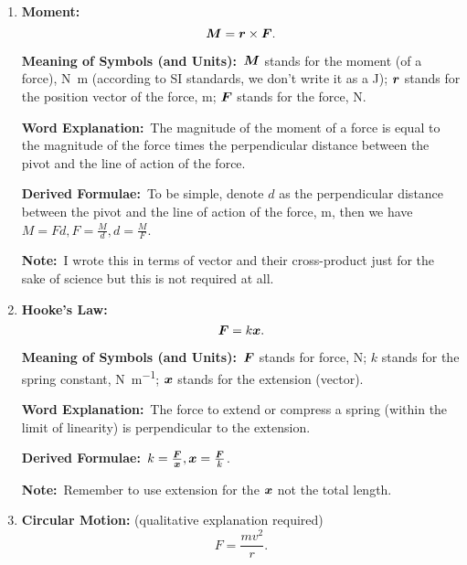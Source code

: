 \documentclass[8pt]{article}
\newcommand{\MeanSymb}{\textbf{Meaning of Symbols (and Units):}\ }
\newcommand{\WordExpl}{\textbf{Word Explanation:}\ }
\newcommand{\DeriForm}{\textbf{Derived Formulae:}\ }
\newcommand{\Note}{\textbf{Note:}\ }
\begin{document}
\begin{enumerate}
                \WordExpl Impulse is equal to the change in momentum.

                \DeriForm The following is derived from Newton's 2nd Law:
                \[
                    \vect{I} = \vect{F} \Delta t.
                \]

                \Note This is only meaningful if momentum is conserved - just like work and energy.

                \item \textbf{Moment:}
                \[
                    \boldsymbol{M} = \boldsymbol{r} \times \boldsymbol{F}.
                \]

                \MeanSymb \(\boldsymbol{M}\) stands for the moment (of a force), \unit{\newton \metre} (according to SI standards, we don't write it as a \unit{\joule}); \(\boldsymbol{r}\) stands for the position vector of the force, \unit{\metre}; \(\boldsymbol{F}\) stands for the force, \unit{\newton}.

                \WordExpl The magnitude of the moment of a force is equal to the magnitude of the force times the perpendicular distance between the pivot and the line of action of the force.

                \DeriForm To be simple, denote \(d\) as the perpendicular distance between the pivot and the line of action of the force, \unit{\metre}, then we have \(M = Fd, F = \frac{M}{d}, d = \frac{M}{F}\).

                \Note I wrote this in terms of vector and their cross-product just for the sake of science but this is not required at all.

                \item \textbf{Hooke's Law:}
                \[
                    \boldsymbol{F} = k \boldsymbol{x}.
                \]

                \MeanSymb \(\boldsymbol{F}\) stands for force, \unit{\newton}; \(k\) stands for the spring constant, \unit{\newton \per \metre}; \(\boldsymbol{x}\) stands for the extension (vector).

                \WordExpl The force to extend or compress a spring (within the limit of linearity) is perpendicular to the extension.

                \DeriForm \(k = \frac{\boldsymbol{F}}{\boldsymbol{x}}, \boldsymbol{x} = \frac{\boldsymbol{F}}{k}\).

                \Note Remember to use extension for the \(\boldsymbol{x}\) not the total length.

                \item \textbf{Circular Motion:} (qualitative explanation required)
                \[
                    F = \frac{mv^2}{r}.
                \]


\end{enumerate}
\end{document}
